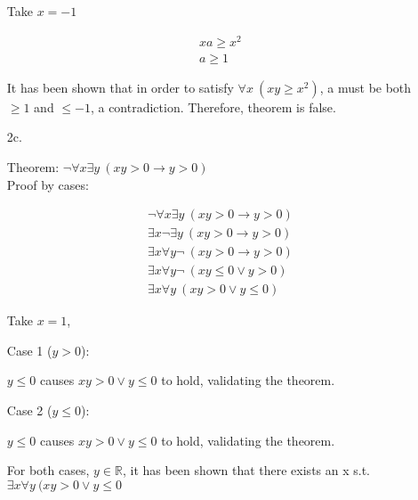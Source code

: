 \documentclass[11pt,letterpaper]{article}
\begin{document}
\begin{enumerate}
Take $x = -1$

\begin{eqnarray}
xa \geq x^2 \\
a \geq 1
\end{eqnarray}

It has been shown that in order to satisfy $ \forall x \: (xy \geq x^2)$, a must be both $\geq 1$ and $\leq -1$, a contradiction. Therefore, theorem is false.

\bigskip
\item[2c.]

Theorem:
$ \neg \forall x \exists y  \: (xy > 0 \rightarrow  y > 0)$ \\

Proof by cases:

\begin{eqnarray}
\neg \forall x \exists y  \: (xy > 0 \rightarrow  y > 0) \\
\exists x  \neg \exists y  \: (xy > 0 \rightarrow  y > 0) \\
\exists x \forall y  \neg \: (xy > 0 \rightarrow  y > 0) \\
\exists x \forall y \neg \: (xy \leq 0 \vee  y > 0) \\
\exists x \forall y \: (xy > 0 \vee  y \leq 0) 
\end{eqnarray}

Take $x = 1$,

\bigskip
Case 1 ($y > 0$):

$y \leq 0$ causes $xy > 0 \vee  y \leq 0$ to hold, validating the theorem.

\bigskip
Case 2 ($y \leq 0$):

$y \leq 0$ causes $xy > 0 \vee  y \leq 0$ to hold, validating the theorem.

\bigskip
For both cases, $y \in \mathbb{R}$, it has been shown that there exists an x s.t. $ \exists x \forall y \: (xy > 0 \vee  y \leq 0$ 

\end{enumerate}
\end{document}
